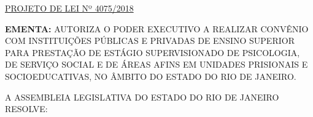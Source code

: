 \documentclass[10pt]{article}
\date{}
\begin{document}
\maketitle
\begin{center}
  \huge
  \vspace{-3cm}\href{http://alerjln1.alerj.rj.gov.br/scpro1519.nsf/f4b46b3cdbba990083256cc900746cf6/064b8a46fa033c5b8325828900628aea?OpenDocument}{PROJETO DE LEI Nº 4075/2018}
\bigskip
\bigskip
\bigskip
  
\end{center}

\textbf{EMENTA:} 
AUTORIZA O PODER EXECUTIVO A REALIZAR CONVÊNIO COM INSTITUIÇÕES PÚBLICAS E PRIVADAS DE ENSINO SUPERIOR PARA PRESTAÇÃO DE ESTÁGIO SUPERVISIONADO DE PSICOLOGIA, DE SERVIÇO SOCIAL E DE ÁREAS AFINS EM UNIDADES PRISIONAIS E SOCIOEDUCATIVAS, NO ÂMBITO DO ESTADO DO RIO DE JANEIRO.








\bigskip

\noindent
A ASSEMBLEIA LEGISLATIVA DO ESTADO DO RIO DE JANEIRO RESOLVE:
\end{document}
